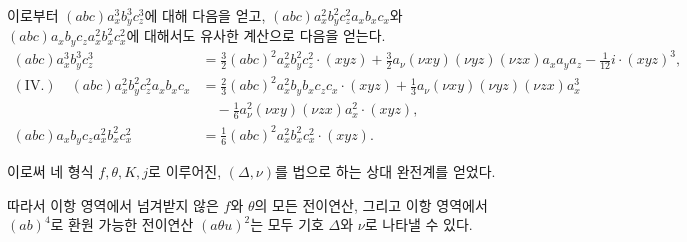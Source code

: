 
이로부터 $(abc)a_x^3b_y^3c_z^3$에 대해 다음을 얻고, $(abc)a_x^2b_y^2c_z^2a_xb_xc_x$와 $(abc)a_xb_yc_za_x^2b_x^2c_x^2$에 대해서도 유사한 계산으로 다음을 얻는다.
\[
\begin{aligned}
(abc)a_x^3b_y^3c_z^3
&=\frac32(abc)^2a_x^2b_y^2c_z^2\cdot(xyz)
+\frac32a_\nu(\nu xy)(\nu yz)(\nu zx)a_xa_ya_z
-\frac1{12}i\cdot(xyz)^3,\\[0.4em]
(\mathrm{IV}.)\quad
(abc)a_x^2b_y^2c_z^2a_xb_xc_x
&=\frac23(abc)^2a_x^2b_yb_xc_zc_x\cdot(xyz)
+\frac13a_\nu(\nu xy)(\nu yz)(\nu zx)a_x^3\\
&\quad-\frac16a_\nu^2(\nu xy)(\nu zx)a_x^2\cdot(xyz),\\[0.4em]
(abc)a_xb_yc_za_x^2b_x^2c_x^2
&=\frac16(abc)^2a_x^2b_x^2c_x^2\cdot(xyz).
\end{aligned}
\]

이로써 네 형식 $f,\theta,K,j$로 이루어진, $(\Delta,\nu)$를 법으로 하는 상대 완전계를 얻었다.

따라서 이항 영역에서 넘겨받지 않은 $f$와 $\theta$의 모든 전이연산, 그리고 이항 영역에서 $(ab)^4$로 환원 가능한 전이연산 $(a\theta u)^2$는 모두 기호 $\Delta$와 $\nu$로 나타낼 수 있다.
